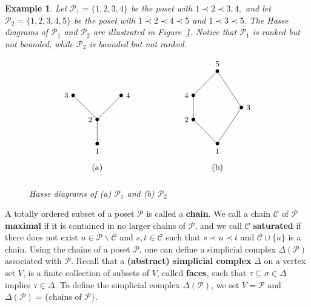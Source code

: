 \documentclass[letterpaper,10pt]{article}
\newtheorem{ex}[theorem]{Example}
\begin{document}
\begin{ex}\label{ex:poset}
Let $\mathcal{P}_1=\{1,2,3,4\}$ be the poset with $1\prec 2\prec 3,4,$ and let $\mathcal{P}_2=\{1,2,3,4,5\}$ be the poset with $1\prec 2\prec 4\prec 5$ and $1\prec 3\prec 5.$ The Hasse diagrams of $\mathcal{P}_1$ and $\mathcal{P}_2$ are illustrated in Figure~\ref{fig:poset}. Notice that $\mathcal{P}_1$ is ranked but not bounded, while $\mathcal{P}_2$ is bounded but not ranked.

\begin{figure}[H]
$$\begin{tikzpicture}
\def\Node{\node [circle, fill, inner sep=1.5pt]}

\Node[label=below:{\small 1}] (l1) at (-5,0){};
\Node[label=left:{\small 2}] (l2) at (-5,1){};
\Node[label=left:{\small 3}] (l3) at (-6,2){};
\Node[label=right:{\small 4}] (l4) at (-4,2){};

\draw (l1)--(l2)--(l3);
\draw (l2)--(l4);

\Node[label=below:{\small 1}] (r1) at (0,0){};
\Node[label=left:{\small 2}] (r2) at (-1,1){};
\Node[label=right:{\small 3}] (r3) at (1,1.5){};
\Node[label=left:{\small 4}] (r4) at (-1,2){};
\Node[label=above:{\small 5}] (r5) at (0,3){};

\draw (r1)--(r2)--(r4)--(r5)--(r3)--(r1);

\node at (-5,-1){(a)};
\node at (0,-1){(b)};
\end{tikzpicture}$$
\caption{Hasse diagrams of (a) $\mathcal{P}_1$ and (b) $\mathcal{P}_2$}
\label{fig:poset}
\end{figure}
\end{ex}
 
A totally ordered subset of a poset $\mathcal{P}$ is called a \textbf{chain}. We call a chain $\mathcal{C}$ of $\mathcal{P}$ \textbf{maximal} if it is contained in no larger chains of $\mathcal{P}$, and we call $\mathcal{C}$ \textbf{saturated} if there does not exist $u\in\mathcal{P}\backslash \mathcal{C}$ and $s,t\in \mathcal{C}$ such that $s\prec u\prec t$ and $\mathcal{C}\cup\{u\}$ is a chain. Using the chains of a poset $\mathcal{P}$, one can define a simplicial complex $\Delta(\mathcal{P})$ associated with $\mathcal{P}$. Recall that a \textbf{(abstract) simplicial complex} $\Delta$ on a vertex set $V$, is a finite collection of subsets of $V$, called \textbf{faces}, such that $\tau\subseteq\sigma\in\Delta$ implies $\tau\in\Delta$. To define the simplicial complex $\Delta(\mathcal{P})$, we set $V=\mathcal{P}$ and $\Delta(\mathcal{P})=\{\text{chains of }\mathcal{P}\}$. 
\end{document}
